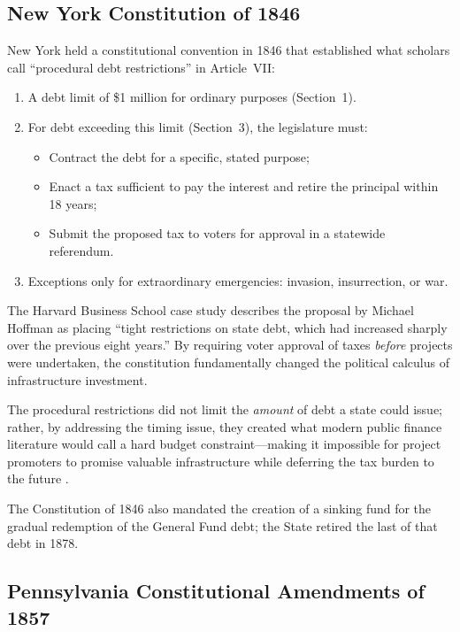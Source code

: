 \documentclass[11pt]{article}
\begin{document}
\subsection{New York Constitution of 1846}

New York held a constitutional convention in 1846 that established what scholars
call ``procedural debt restrictions'' in Article~VII:

\begin{enumerate}
  \item A debt limit of \$1 million for ordinary purposes (Section~1).
  \item For debt exceeding this limit (Section~3), the legislature must:
    \begin{itemize}
      \item Contract the debt for a specific, stated purpose;
      \item Enact a tax sufficient to pay the interest and retire the principal
        within 18 years;
      \item Submit the proposed tax to voters for approval in a statewide
        referendum.
    \end{itemize}
  \item Exceptions only for extraordinary emergencies: invasion, insurrection,
    or war.
\end{enumerate}

The Harvard Business School case study \citep{moss2016debt} describes the proposal
by Michael Hoffman as placing ``tight restrictions on state debt, which had
increased sharply over the previous eight years.''  By requiring voter approval
of taxes \emph{before} projects were undertaken, the constitution fundamentally
changed the political calculus of infrastructure investment.

The procedural restrictions did not limit the \emph{amount} of debt a state
could issue; rather, by addressing the timing issue, they created what modern
public finance literature would call a hard budget constraint---making it
impossible for project promoters to promise valuable infrastructure while
deferring the tax burden to the future \citep{grinath1997debt}.

The Constitution of 1846 also mandated the creation of a sinking fund for the
gradual redemption of the General Fund debt; the State retired the last of that
debt in 1878.

\subsection{Pennsylvania Constitutional Amendments of 1857}
\end{document}
